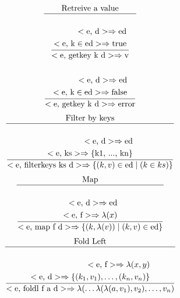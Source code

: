 \documentclass[a4paper, 10pt]{article}
\newcommand{\te}[1]{\text{#1}}
\theoremstyle{plain}%
\theoremstyle{definition}
\theoremstyle{remark}
\begin{document}
\begin{multicols}{2}
\begin{gather*}
\end{gather*}
\begin{gather*}
	\te{Retreive a value} \\ \hline \\
	\dfrac{	\begin{aligned}
		<\te{e, d}> \Rightarrow \te{ed} \\
		<\te{e, k} \in \te{ed}> \Rightarrow \te{true}
	\end{aligned}}{<\te{e, getkey k d}> \Rightarrow \te{v}} \\ \\
	\dfrac{	\begin{aligned}
		<\te{e, d}> \Rightarrow \te{ed} \\
		<\te{e, k} \in \te{ed}> \Rightarrow \te{false}
	\end{aligned}}{<\te{e, getkey k d}> \Rightarrow \te{error}}
\end{gather*}
\begin{gather*}
	\te{Filter by keys} \\ \hline \\
	\dfrac{	\begin{aligned}
		<\te{e, d}> \Rightarrow \te{ed} \\
		<\te{e, ks}> \Rightarrow \te{\{k1, ..., kn\}}
	\end{aligned}}{<\te{e, filterkeys ks d}> \Rightarrow \{ (k, v) \in \te{ed} \mid (k \in ks) \}}
\end{gather*}
\begin{gather*}
	\te{Map} \\ \hline \\
	\dfrac{	\begin{aligned}
		<\te{e, d}> \Rightarrow \te{ed} \\
		<\te{e, f}> \Rightarrow \lambda(x)
	\end{aligned}}
	{<\te{e, map f d}> \Rightarrow \{ (k, \lambda(v)) \mid (k, v) \in \te{ed}  \}}
\end{gather*}
\begin{gather*}
	\te{Fold Left} \\ \hline \\
	\dfrac{\begin{aligned}
		<\te{e, f}> \Rightarrow \lambda(x,y)  \\
		<\te{e, d}> \Rightarrow \{(k_1, v_1), \hdots, (k_n, v_n)\}
	\end{aligned}}{<\te{e, foldl f a d}> \Rightarrow \lambda( \hdots \lambda(\lambda(a, v_1), v_2), \hdots, v_n)} \\ \\
\end{gather*}


\end{multicols}
\end{document}
